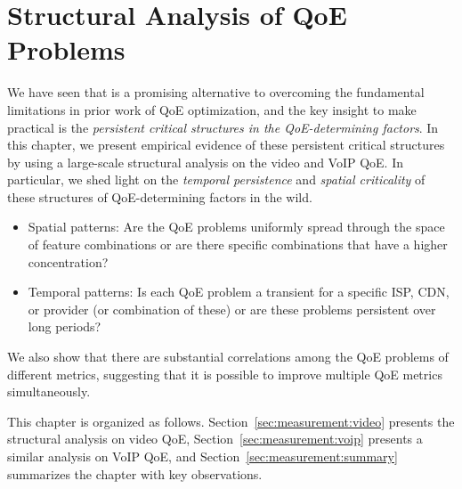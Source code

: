 \chapter{Structural Analysis of QoE Problems}
\label{ch:measurement}


We have seen that \ddn is a promising alternative to overcoming the fundamental 
limitations in prior work of QoE optimization, and the key insight to make \ddn practical
is the {\em persistent critical structures in the QoE-determining factors}.
In this chapter, we present empirical evidence of these persistent critical structures by 
using a large-scale structural analysis on the video and VoIP QoE.
In particular, we shed light on the {\em temporal persistence} and {\em spatial criticality}
of these structures of QoE-determining factors in the wild.
\begin{itemize}


\item {Spatial patterns:} 
Are the QoE problems uniformly spread through the 
space of feature combinations or are there specific 
combinations that have a higher concentration?

\item {Temporal patterns:} 
Is each QoE problem a transient for 
a specific ISP, CDN, or provider (or combination of these) or are 
these problems persistent over long periods?


\end{itemize}
We also show that there are substantial correlations
among the QoE problems of different metrics, suggesting that
it is possible to improve multiple QoE metrics simultaneously.

This chapter is organized as follows. 
Section~\ref{sec:measurement:video} presents the structural analysis
on video QoE,
Section~\ref{sec:measurement:voip} presents a similar analysis on 
VoIP QoE, and Section~\ref{sec:measurement:summary} summarizes
the chapter with key observations.


